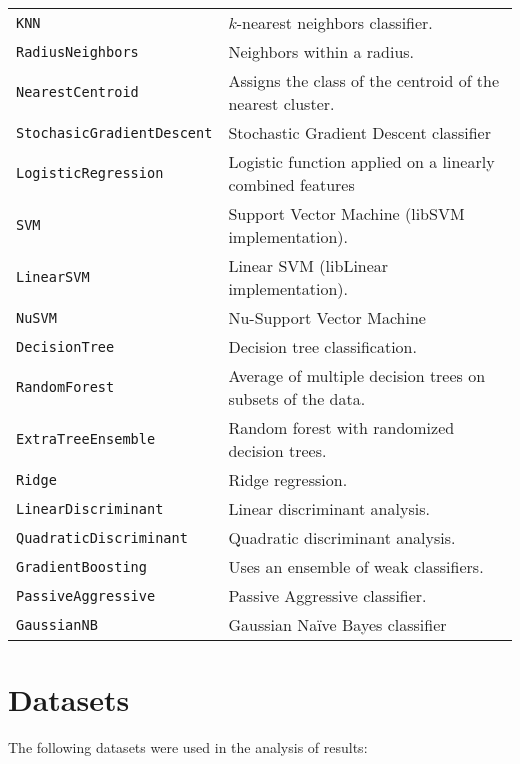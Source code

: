 \begin{tabularx}{\textwidth}{l X}
\texttt{KNN} & $k$-nearest neighbors classifier.\\
\texttt{RadiusNeighbors} & Neighbors within a radius. \\
\texttt{NearestCentroid} & Assigns the class of the centroid of the nearest cluster.\\
\texttt{StochasicGradientDescent} & Stochastic Gradient Descent classifier\\
\texttt{LogisticRegression} & Logistic function applied on a linearly combined features\\
\texttt{SVM} & Support Vector Machine (libSVM implementation).\\
\texttt{LinearSVM} & Linear SVM (libLinear implementation).\\
\texttt{NuSVM} & Nu-Support Vector Machine\\
\texttt{DecisionTree} & Decision tree classification.\\
\texttt{RandomForest} & Average of multiple decision trees on subsets of the data.\\
\texttt{ExtraTreeEnsemble} & Random forest with randomized decision trees.\\
\texttt{Ridge} & Ridge regression.\\
\texttt{LinearDiscriminant} & Linear discriminant analysis.\\
\texttt{QuadraticDiscriminant} & Quadratic discriminant analysis.\\
\texttt{GradientBoosting} & Uses an ensemble of weak classifiers.\\
\texttt{PassiveAggressive} & Passive Aggressive classifier.\\
\texttt{GaussianNB} & Gaussian Na\"ive Bayes classifier\\
\end{tabularx}


\chapter{Datasets}

The following datasets were used in the analysis of results:

